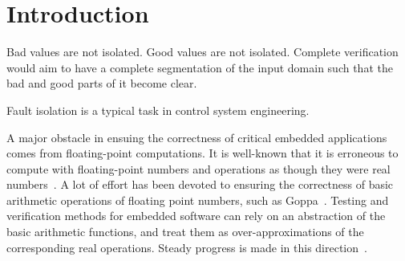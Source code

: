 \section{Introduction}

Bad values are not isolated. Good values are not isolated. Complete verification would aim to have a complete segmentation of the input domain such that the bad and good parts of it become clear. 

Fault isolation is a typical task in control system engineering. 

A major obstacle in ensuing the correctness of critical embedded applications comes from floating-point computations. It is well-known that it is erroneous to compute with floating-point numbers and operations as though they were real numbers~\cite{pitfalls}. A lot of effort has been devoted to ensuring the correctness of basic arithmetic operations of floating point numbers, such as Goppa~\cite{}. Testing and verification methods for embedded software can rely on an abstraction of the basic arithmetic functions, and treat them as over-approximations of the corresponding real operations. Steady progress is made in this direction~\cite{}. 

